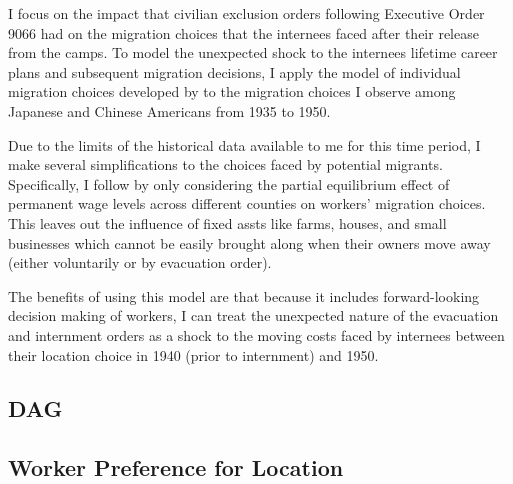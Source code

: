 
I focus on the impact that civilian exclusion orders following Executive Order 9066
had on the migration choices that the internees faced after their release from the camps.
To model the unexpected shock to the internees lifetime career plans and subsequent migration decisions,
I apply the model of individual migration choices developed by \cite{kennanEffectExpectedIncome2011} 
to the migration choices I observe among Japanese and Chinese Americans from 1935 to 1950.

Due to the limits of the historical data available to me for this time period,
I make several simplifications to the choices faced by potential migrants.
Specifically, I follow \citeauthor{kennanEffectExpectedIncome2011} by only considering the partial equilibrium effect
of permanent wage levels across different counties on workers' migration choices.
This leaves out the influence of fixed assts like farms, houses, and small businesses
which cannot be easily brought along when their owners move away (either voluntarily or by evacuation order).

The benefits of using this model are that because it includes forward-looking decision making of workers,
I can treat the unexpected nature of the evacuation and internment orders as a shock to the moving costs faced by 
internees between their location choice in 1940 (prior to internment) and 1950.

\subsection{DAG}

\begin{center}
\end{center}

\subsection{Worker Preference for Location}

